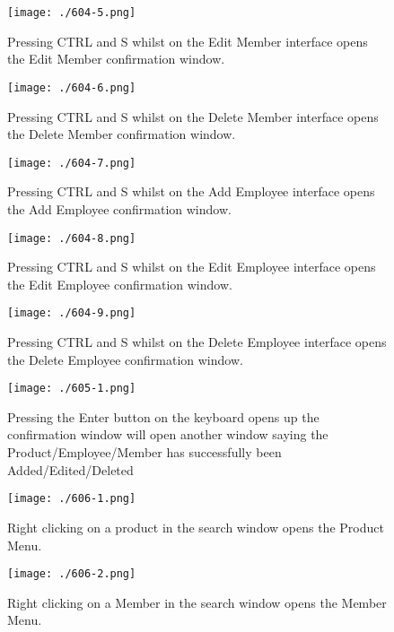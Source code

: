 \begin{figure}[H]
    \texttt{[image: ./604-5.png]}
    \caption{Pressing CTRL and S whilst on the Edit Member interface opens the Edit Member confirmation window.} \label{fig:604-5}
\end{figure}

\begin{figure}[H]
    \texttt{[image: ./604-6.png]}
    \caption{Pressing CTRL and S whilst on the Delete Member interface opens the Delete Member confirmation window.} \label{fig:604-6}
\end{figure}

\begin{figure}[H]
    \texttt{[image: ./604-7.png]}
    \caption{Pressing CTRL and S whilst on the Add Employee interface opens the Add Employee confirmation window.} \label{fig:604-7}
\end{figure}

\begin{figure}[H]
    \texttt{[image: ./604-8.png]}
    \caption{Pressing CTRL and S whilst on the Edit Employee interface opens the Edit Employee confirmation window.} \label{fig:604-8}
\end{figure}

\begin{figure}[H]
    \texttt{[image: ./604-9.png]}
    \caption{Pressing CTRL and S whilst on the Delete Employee interface opens the Delete Employee confirmation window.} \label{fig:604-9}
\end{figure}

\begin{figure}[H]
    \texttt{[image: ./605-1.png]}
    \caption{Pressing the Enter button on the keyboard opens up the confirmation window will open another window saying the Product/Employee/Member has successfully been Added/Edited/Deleted} \label{fig:605-1}
\end{figure}

\begin{figure}[H]
    \texttt{[image: ./606-1.png]}
    \caption{Right clicking on a product in the search window opens the Product Menu.} \label{fig:606-1}
\end{figure}

\begin{figure}[H]
    \texttt{[image: ./606-2.png]}
    \caption{Right clicking on a Member in the search window opens the Member Menu.} \label{fig:606-2}
\end{figure}

